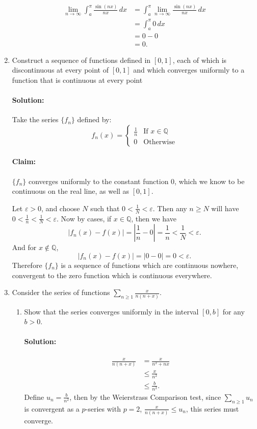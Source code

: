 \documentclass{article}
\begin{document}
\begin{enumerate}
  \begin{align*}
  \lim_{n \to \infty} \int_{a}^{\pi} \frac{\sin(nx)}{nx} \, d x 
  &=\int_{a}^{\pi} \lim_{n \to \infty} \frac{\sin(nx)}{nx} \, d x \\
  &=\int_{a}^{\pi} 0 \, d x \\
  &= 0-0 \\
  &= 0
  .\end{align*}

\item Construct a sequence of functions defined in $[0,1]$, each of which is discontinuous at every point of $[0,1]$ and which converges uniformly to a function that is continuous at every point 

  \paragraph{Solution: }Take the series $\{f_n\} $ defined by:
  \[
    f_n(x)=\begin{cases}
      \frac{1}{n}&\text{If } x\in \mathbb{Q}\\
      0&\text{Otherwise}
    \end{cases}
  \] 
  \paragraph{Claim:}  $\{f_n\} $ converges uniformly to the constant function $0$, which we know to be continuous on the real line, as well as $[0,1]$. 

  Let $\varepsilon>0$, and choose $N$ such that $0<\frac{1}{N}<\varepsilon$.
  Then any $n\geq N$ will have $0<\frac{1}{n}<\frac{1}{N}<\varepsilon$. Now by cases, if $x\in \mathbb{Q}$, then we have 
  \[
  |f_n(x)-f(x)|=\left|\frac{1}{n}-0\right|=\frac{1}{n}<\frac{1}{N}<\varepsilon
  .\] 
  And for $x\not\in \mathbb{Q}$, 
\[
  |f_n(x)-f(x)|=\left|0-0\right|=0<\varepsilon
.\] 
  Therefore $\{f_n\} $ is a sequence of functions which are continuous nowhere, convergent to the zero function which is continuous everywhere. 

\item Consider the series of functions $\sum_{n\geq 1}^{} \frac{x}{n(n+x)}$.
  \begin{enumerate}
    \item Show that the series converges uniformly in the interval $[0,b]$ for any $b>0$.

        \paragraph{Solution:} 
        \begin{align*}
            \frac{x}{n(n+x)}&= \frac{x}{n^2+nx} \\
                            &\leq \frac{x}{n^2}\\
                            &\leq \frac{b}{n^2}
        .\end{align*}
        Define $u_n=\frac{b}{n^2}$, then by the Weierstrass Comparison test, since $\sum_{n\geq 1}^{} u_n$ is convergent as a $p$-series with $p=2$, $\frac{x}{n(n+x)}\leq u_n$, this series must converge.


\end{enumerate}
\end{enumerate}
\end{document}

